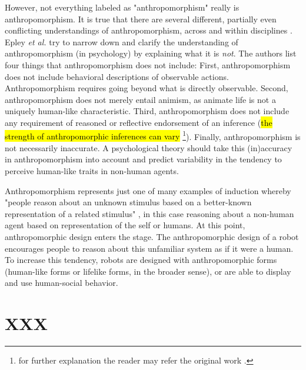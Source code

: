 \documentclass[lettersize, apacite, twoside, HRI]{apa_HRI}
\begin{document}
	However, not everything labeled as "anthropomorphism" really is anthropomorphism.	It is true that there are several different, partially even conflicting understandings of anthropomorphism, across and within disciplines \cite{duffy_anthropomorphism_2002}. Epley \textit{et al.} \cite{epley_when_2008} try to narrow down and clarify the understanding of anthropomorphism (in psychology) by explaining what it is \textit{not}. The authors list four things that anthropomorphism does not include: First, anthropomorphism does not include behavioral descriptions of observable actions. Anthropomorphism requires going beyond what is directly observable. Second, anthropomorphism does not merely entail animism, as animate life is not a uniquely human-like characteristic. Third, anthropomorphism does not include any requirement of reasoned or reflective endorsement of an inference (\hl{the strength of anthropomorphic inferences can vary} \footnote{for further explanation the reader may refer the original work \cite{epley_when_2008}.}).	Finally, anthropomorphism is not necessarily inaccurate. A psychological theory should take this (in)accuracy in anthropomorphism into account and predict variability in the tendency to perceive human-like traits in non-human agents.
	 


	Anthropomorphism represents just one of many examples of induction whereby "people reason about an unknown stimulus based on a better-known representation of a related stimulus" \cite{epley_when_2008}, in this case reasoning about a non-human agent based on representation of the self or humans. At this point, anthropomorphic design enters the stage. The anthropomorphic design of a robot encourages people to reason about this unfamiliar system as if it were a human. To increase this tendency, robots are designed with anthropomorphic forms (human-like forms or lifelike forms, in the broader sense), or are able to display and use human-social behavior.
	
	

%
%
%
%
%
%


\section{XXX}
\label{sec:}


%
%
%
%
%
%
\end{document}
